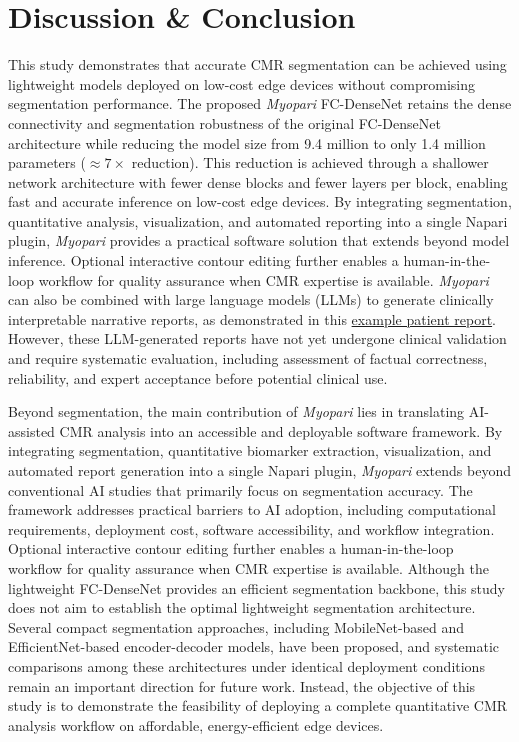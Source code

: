 \documentclass[runningheads]{llncs}
\begin{document}
\section{Discussion \& Conclusion}

This study demonstrates that accurate CMR segmentation can be achieved using lightweight models deployed on low-cost edge devices without compromising segmentation performance. The proposed \textit{Myopari} FC-DenseNet retains the dense connectivity and segmentation robustness of the original FC-DenseNet architecture while reducing the model size from 9.4 million to only 1.4 million parameters ($\approx 7\times$ reduction). This reduction is achieved through a shallower network architecture with fewer dense blocks and fewer layers per block, enabling fast and accurate inference on low-cost edge devices. By integrating segmentation, quantitative analysis, visualization, and automated reporting into a single Napari plugin, \textit{Myopari} provides a practical software solution that extends beyond model inference. Optional interactive contour editing further enables a human-in-the-loop workflow for quality assurance when CMR expertise is available. \textit{Myopari} can also be combined with large language models (LLMs) to generate clinically interpretable narrative reports, as demonstrated in this \href{https://github.com/QBioImaging/myopari/blob/main/reports/myopari_report_patient101_4d.nii.md}{example patient report}. However, these LLM-generated reports have not yet undergone clinical validation and require systematic evaluation, including assessment of factual correctness, reliability, and expert acceptance before potential clinical use.

Beyond segmentation, the main contribution of \textit{Myopari} lies in translating AI-assisted CMR analysis into an accessible and deployable software framework. By integrating segmentation, quantitative biomarker extraction, visualization, and automated report generation into a single Napari plugin, \textit{Myopari} extends beyond conventional AI studies that primarily focus on segmentation accuracy. The framework addresses practical barriers to AI adoption, including computational requirements, deployment cost, software accessibility, and workflow integration. Optional interactive contour editing further enables a human-in-the-loop workflow for quality assurance when CMR expertise is available. Although the lightweight FC-DenseNet provides an efficient segmentation backbone, this study does not aim to establish the optimal lightweight segmentation architecture. Several compact segmentation approaches, including MobileNet-based and EfficientNet-based encoder-decoder models, have been proposed, and systematic comparisons among these architectures under identical deployment conditions remain an important direction for future work. Instead, the objective of this study is to demonstrate the feasibility of deploying a complete quantitative CMR analysis workflow on affordable, energy-efficient edge devices.
\end{document}
